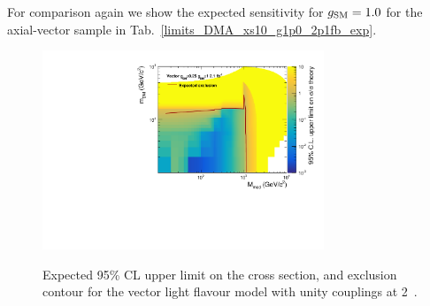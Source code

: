 
 
 
 

\clearpage
For comparison again we show the expected sensitivity for $g_{\rm SM}=1.0$ for the axial-vector sample in Tab.~\ref{limits_DMA_xs10_g1p0_2p1fb_exp}.

 
\clearpage


%
% 
% 
% 




\begin{figure}
\begin{center}
\includegraphics[width=0.75\textwidth]{figures/DMplots/DMV_finalCanvasExpLimit.pdf} \\
\caption{Expected 95\% CL upper limit on the cross section, and exclusion
contour for the vector light flavour model with unity couplings at 2~\ifb.}
\label{fig:dm_A_g1_2fb_2dlimits}
\end{center}
\end{figure}






